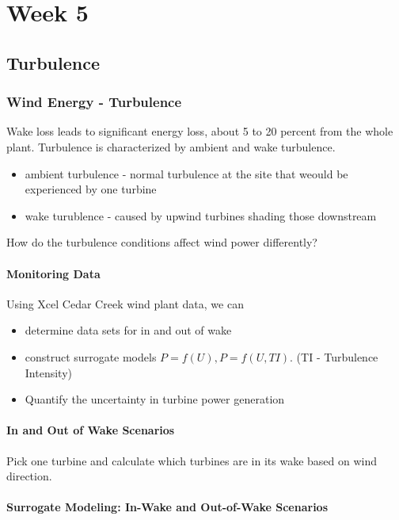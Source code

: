\documentclass[12pt, a4paper]{report}
\begin{document}
  \part{Week 5}

  \chapter{Turbulence}

  \section{Wind Energy - Turbulence}

  Wake loss leads to significant energy loss, about 5 to 20 percent from the whole plant. Turbulence is characterized by ambient and wake turbulence.

  \begin{itemize}
    \item ambient turbulence - normal turbulence at the site that weould be experienced by one turbine
    \item wake turublence - caused by upwind turbines shading those downstream
  \end{itemize}

  How do the turbulence conditions affect wind power differently?

  \subsection{Monitoring Data}

  Using Xcel Cedar Creek wind plant data, we can

  \begin{itemize}
    \item determine data sets for in and out of wake
    \item construct surrogate models $ P = f(U), P = f(U, TI). $ (TI - Turbulence Intensity)
    \item Quantify the uncertainty in turbine power generation
  \end{itemize}

  \subsection{In and Out of Wake Scenarios}

  Pick one turbine and calculate which turbines are in its wake based on wind direction.

  \subsection{Surrogate Modeling: In-Wake and Out-of-Wake Scenarios}
\end{document}

